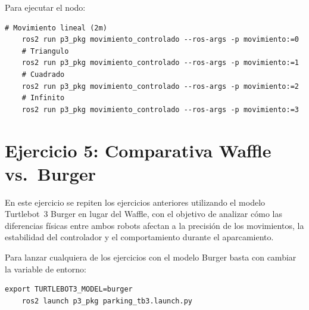 
Para ejecutar el nodo:

\begin{lstlisting}[style=bash]
	# Movimiento lineal (2m)
	ros2 run p3_pkg movimiento_controlado --ros-args -p movimiento:=0
	# Triangulo
	ros2 run p3_pkg movimiento_controlado --ros-args -p movimiento:=1
	# Cuadrado
	ros2 run p3_pkg movimiento_controlado --ros-args -p movimiento:=2
	# Infinito
	ros2 run p3_pkg movimiento_controlado --ros-args -p movimiento:=3
\end{lstlisting}

\section{Ejercicio 5: Comparativa Waffle vs.\ Burger}

En este ejercicio se repiten los ejercicios anteriores utilizando el modelo Turtlebot~3 Burger en lugar del Waffle, con el objetivo de analizar cómo las diferencias físicas entre ambos robots afectan a la precisión de los movimientos, la estabilidad del controlador y el comportamiento durante el aparcamiento.

Para lanzar cualquiera de los ejercicios con el modelo Burger basta con cambiar la variable de entorno:

\begin{lstlisting}[style=bash]
	export TURTLEBOT3_MODEL=burger
	ros2 launch p3_pkg parking_tb3.launch.py
\end{lstlisting}

